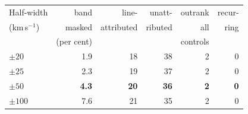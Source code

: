 \begin{tabular}{@{}lrrrrr@{}}
\hline
Half-width & band & line- & unatt- & outrank & recur- \\
(km\,s$^{-1}$) & masked & attributed & ributed & all & ring \\
 & (per cent) & & & controls & \\
\hline
$\pm20$ & 1.9 & 18 & 38 & 2 & 0 \\
$\pm25$ & 2.3 & 19 & 37 & 2 & 0 \\
\textbf{$\pm50$} & \textbf{4.3} & \textbf{20} & \textbf{36} & \textbf{2} & \textbf{0} \\
$\pm100$ & 7.6 & 21 & 35 & 2 & 0 \\
\hline
\end{tabular}
